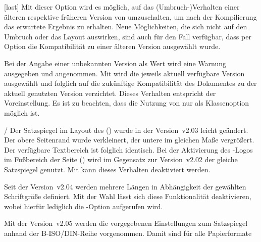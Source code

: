 \begin{Declaration*}{}
\begin{Declaration*}{}
\begin{Declaration*}{}
\begin{Declaration}[v2.03]{}[last]
\printdeclarationlist%
%
%
Mit dieser Option wird es möglich, auf das (Umbruch-)Verhalten einer älteren 
respektive früheren Version von \TUDScript umzuschalten, um nach der 
Kompilierung das erwartete Ergebnis zu erhalten. Neue Möglichkeiten, die sich 
nicht auf den Umbruch oder das Layout auswirken, sind auch für den Fall 
verfügbar, dass per Option die Kompatibilität zu einer älteren Version 
ausgewählt wurde. 

Bei der Angabe einer unbekannten Version als Wert wird eine Warnung ausgegeben 
und  angenommen. Mit  wird die 
jeweils aktuell verfügbare Version ausgewählt und folglich auf die zukünftige 
Kompatibilität des Dokumentes zu der aktuell genutzten Version verzichtet. 
Dieses Verhalten entspricht der Voreinstellung. Es ist zu beachten, dass die 
Nutzung von  nur als Klassenoption möglich ist.
%
\begin{values}{}
\item[\PValue{first}/\PValue{2.02}]
  Der Satzspiegel im Layout des \CDs () wurde in 
  der Version~v2.03 leicht geändert. Der obere Seitenrand wurde verkleinert, 
  der untere im gleichen Maße vergrößert. Der verfügbare Textbereich ist 
  folglich identisch. Bei der Aktivierung des \DDC-Logos im Fußbereich der 
  Seite () wird im Gegensatz zur Version~v2.02 der 
  gleiche Satzspiegel genutzt. Mit  kann dieses 
  Verhalten deaktiviert werden.
\item[\PValue{2.03}]
  Seit der Version~v2.04 werden mehrere Längen in Abhängigkeit der gewählten 
  Schriftgröße definiert. Mit der Wahl  lässt sich diese 
  Funktionalität deaktivieren, wobei hierfür lediglich die \TUDScript-Option 
   aufgerufen wird. 
\item[\PValue{2.04}]
  Mit der Version~v2.05 werden die vorgegebenen Einstellungen zum Satzspiegel 
  anhand der B-ISO/DIN-Reihe vorgenommen. Damit sind für alle Papierformate 

\end{values}
\end{Declaration}
\end{Declaration*}
\end{Declaration*}
\end{Declaration*}
